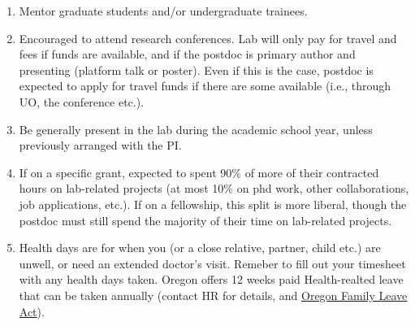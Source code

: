 \documentclass[12pt]{article}
\begin{document}
\begin{enumerate}
  shift to weekends (and days off to week days) so avoid weekend
  commitments that cannot be shifted during the peak field season.
\item Mentor graduate students and/or undergraduate trainees.
\item Encouraged to attend research conferences. Lab will only pay
  for travel and fees if funds are available, and if the postdoc is
  primary author and presenting (platform talk or poster). Even if
  this is the case, postdoc is expected to apply for travel funds if
  there are some available (i.e., through UO, the conference etc.).
\item Be generally present in the lab during the academic school year,
  unless previously arranged with the PI.
\item If on a specific grant, expected to spent 90\% of more of
  their contracted hours on lab-related projects (at most 10\%
  on phd work, other collaborations, job applications, etc.). If on a fellowship,
  this split is more liberal, though the postdoc must still
  spend the majority of their time on lab-related projects.
\item Health days are for when you (or a close relative, partner,
  child etc.) are unwell, or need an extended doctor's visit. Remeber
  to fill out your timesheet with any health days taken. Oregon offers
  12 weeks paid Health-realted leave that can be taken annually
  (contact HR for details, and
  \href{https://www.oregon.gov/boli/workers/pages/oregon-family-leave.aspx}{Oregon
  Family Leave Act}).
\end{enumerate}
\end{document}
